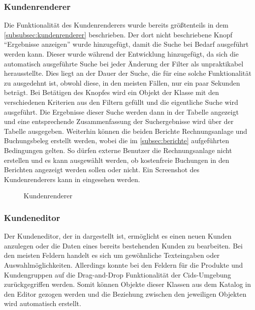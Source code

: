 \subsubsection{Kundenrenderer}
Die Funktionalität des Kundenrenderers wurde bereits größtenteils in dem \autoref{subsubsec:kundenrenderer} beschrieben.
Der dort nicht beschriebene Knopf "`Ergebnisse anzeigen"' wurde hinzugefügt, damit die Suche bei Bedarf ausgeführt werden kann.
Dieser wurde während der Entwicklung hinzugefügt, da sich die automatisch ausgeführte Suche bei jeder Änderung der Filter als unpraktikabel herausstellte.
Dies liegt an der Dauer der Suche, die für eine solche Funktionalität zu ausgedehnt ist, obwohl diese, in den meisten Fällen, nur ein paar Sekunden beträgt.
Bei Betätigen des Knopfes wird ein Objekt der Klasse  mit den verschiedenen Kriterien aus den Filtern gefüllt und die eigentliche Suche wird ausgeführt.
Die Ergebnisse dieser Suche werden dann in der Tabelle angezeigt und eine entsprechende Zusammenfassung der Suchergebnisse wird über der Tabelle ausgegeben.
Weiterhin können die beiden Berichte Rechnungsanlage und Buchungsbeleg erstellt werden, wobei die im \autoref{subsec:berichte} aufgeführten Bedingungen gelten.
So dürfen externe Benutzer die Rechnungsanlage nicht erstellen und es kann ausgewählt werden, ob kostenfreie Buchungen in den Berichten angezeigt werden sollen oder nicht.
Ein Screenshot des Kundenrenderers kann in  eingesehen werden.

\begin{figure}[htb]
	\centering
	\caption{Kundenrenderer}
	\label{fig:kundenrenderer}
\end{figure}
\subsubsection{Kundeneditor}
Der Kundeneditor, der in  dargestellt ist, ermöglicht es einen neuen Kunden anzulegen oder die Daten eines bereits bestehenden Kunden zu bearbeiten.
Bei den meisten Feldern handelt es sich um gewöhnliche Texteingaben oder Auswahlmöglichkeiten.
Allerdings konnte bei den Feldern für die Produkte und Kundengruppen auf die Drag-and-Drop Funktionalität der Cids-Umgebung zurückgegriffen werden.
Somit können Objekte dieser Klassen aus dem Katalog in den Editor gezogen werden und die Beziehung zwischen den jeweiligen Objekten wird automatisch erstellt.

